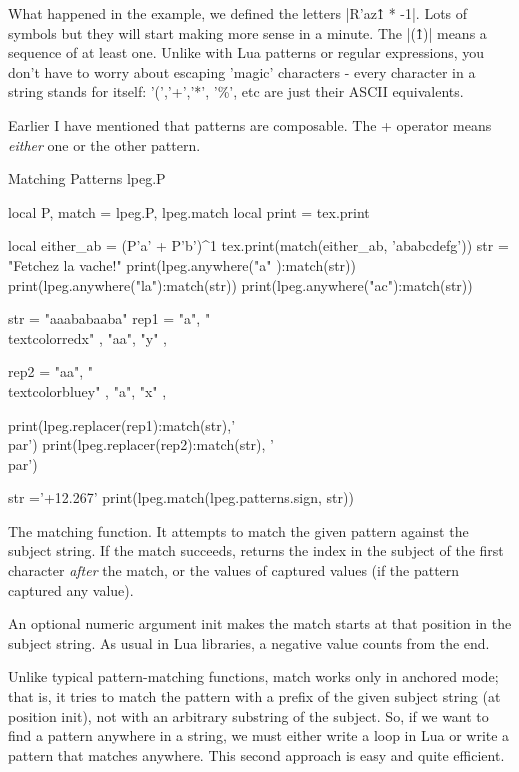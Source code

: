 What happened in the example, we defined the letters |R'az\^1 * -1|. Lots of symbols but they will start making more sense in a minute. The  |(\^1)| means a sequence of at least one. Unlike with Lua patterns or regular expressions, you don't have to worry about escaping 'magic' characters - every character in a string stands for itself: '(','+','*', '\%', etc are just their ASCII equivalents. 

Earlier I have mentioned that patterns are composable. The + operator means \emph{either} one or the other pattern.

\begin{texexample}{Matching Patterns lpeg.P}{}
\begin{luacode}
local P, match = lpeg.P, lpeg.match
local print = tex.print
       
local either_ab = (P'a' + P'b')^1
        tex.print(match(either_ab,  'ababcdefg'))
     str = "Fetchez la vache!"
print(lpeg.anywhere("a" ):match(str))
print(lpeg.anywhere("la"):match(str))
print(lpeg.anywhere("ac"):match(str))  



 str = "aaababaaba"
rep1 = {
    { "a",  "\\textcolor{red}{x}" },
    { "aa", "y" },
}

rep2 = {
    { "aa", "\\textcolor{blue}{y}" },
    { "a",  "x" },
}

print(lpeg.replacer(rep1):match(str),'\\par')
print(lpeg.replacer(rep2):match(str), '\\par') 

str ='+12.267'
print(lpeg.match(lpeg.patterns.sign, str))
\end{luacode}
\end{texexample}

The matching function. It attempts to match the given pattern against the subject string. If the match succeeds, returns the index in the subject of the first character \emph{after} the match, or the values of captured values (if the pattern captured any value).

An optional numeric argument init makes the match starts at that position in the subject string. As usual in Lua libraries, a negative value counts from the end.

Unlike typical pattern-matching functions, match works only in anchored mode; that is, it tries to match the pattern with a prefix of the given subject string (at position init), not with an arbitrary substring of the subject. So, if we want to find a pattern anywhere in a string, we must either write a loop in Lua or write a pattern that matches anywhere. This second approach is easy and quite efficient.

